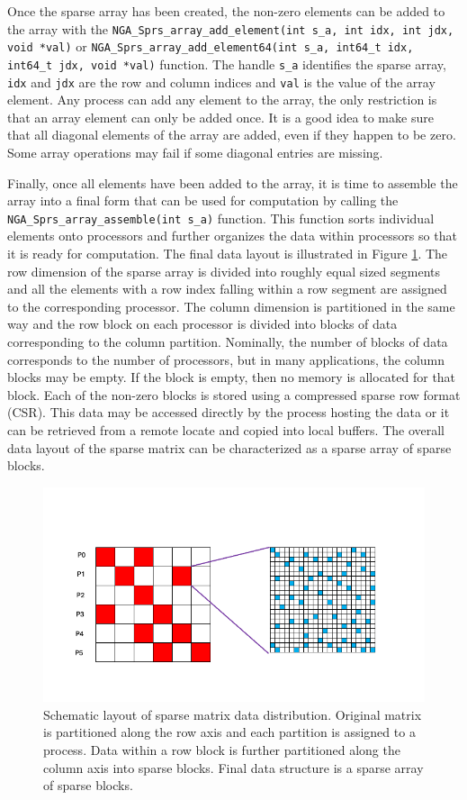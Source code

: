 Once the sparse array has been created, the non-zero elements can be added to
the array with the \texttt{NGA\_Sprs\_array\_add\_element(int s\_a, int idx, int jdx,
void *val)} or \texttt{NGA\_Sprs\_array\_add\_element64(int s\_a, int64\_t idx,
int64\_t jdx, void *val)} function. The handle \texttt{s\_a} identifies the
sparse array,
\texttt{idx} and \texttt{jdx} are the row and column indices and \texttt{val}
is the value of the array element.  Any process can add any element to the
array, the only restriction is that an array element can only be added once. It
is a good idea to make sure that all diagonal elements of the array are added,
even if they happen to be zero. Some array operations may fail if some diagonal
entries are missing.

Finally, once all elements have been added to the array, it is time to assemble
the array into a final form that can be used for computation by calling the
\texttt{NGA\_Sprs\_array\_assemble(int s\_a)} function. This function sorts
individual elements onto processors and further organizes the data within
processors so that it is ready for computation. The final data layout is
illustrated in Figure \ref{fig:layout}. The row dimension of the sparse array is
divided into roughly equal sized segments and all the elements with a row index
falling within a row segment are assigned to the corresponding processor. The
column dimension is partitioned in the same way and the row block on each
processor is divided into blocks of data corresponding to the column partition.
Nominally, the number of blocks of data corresponds to the number of processors,
but in many applications, the column blocks may be empty. If the block is empty,
then no memory is allocated for that block. Each of the non-zero blocks is stored
using a compressed sparse row format (CSR). This data may be accessed directly
by the process hosting the data or it can be retrieved from a remote locate and
copied into local buffers. The overall data layout of the sparse matrix can be
characterized as a sparse array of sparse blocks.

\begin{figure}
  \centering
  \includegraphics*[width=5in, keepaspectratio=true]{sprs-layout}
  \caption{Schematic layout of sparse matrix data distribution. Original
matrix is partitioned along the row axis and each partition is assigned to a
process. Data within a row block is further partitioned along the column axis
into sparse blocks. Final data structure is a sparse array of sparse blocks.}
  \label{fig:layout}
\end{figure}

